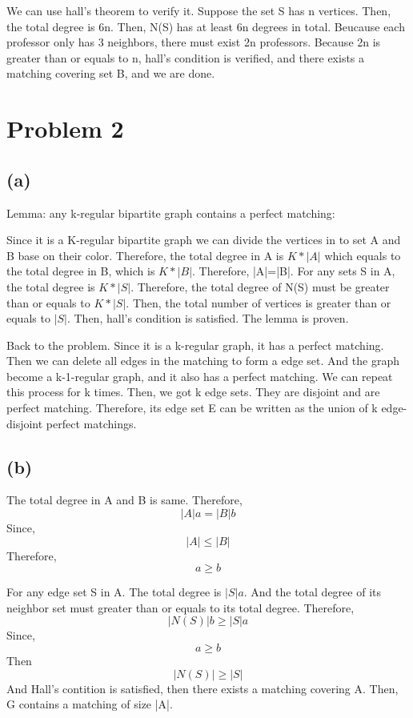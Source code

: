 \documentclass[11pt]{article}
\begin{document}
We can use hall's theorem to verify it. Suppose the set S has n vertices. Then, the total degree is 6n. Then, N(S) has at least 6n degrees in total. Beucause each professor only has 3 neighbors, there must exist 2n professors. Because 2n is greater than or equals to n, hall's condition is verified, and there exists a matching covering set B, and we are done.

\section{Problem 2}
\subsection*{(a)}
Lemma: any k-regular bipartite graph contains a perfect matching:

Since it is a K-regular bipartite graph we can divide the vertices in to set A and B base on their color. Therefore, the total degree in A is $K * |A|$ which equals to the total degree in B, which is $K * |B|$. Therefore, |A|=|B|. For any sets S in A, the total degree is $K * |S|$. Therefore, the total degree of N(S) must be greater than or equals to $K * |S|$. Then, the total number of vertices is  greater than or equals to $|S|$. Then, hall's condition is satisfied. The lemma is proven.

Back to the problem. Since it is a k-regular graph, it has a perfect matching. Then we can delete all edges in the matching to form a edge set. And the graph become a k-1-regular graph, and it also has a perfect matching. We can repeat this process for k times. Then, we got k edge sets. They are disjoint and are perfect matching. Therefore, its edge set E can be written as the union of k edge-disjoint perfect matchings.

\subsection*{(b)}

The total degree in A and B is same. Therefore, $$|A|a=|B|b$$
Since, $$|A|\le|B|$$
Therefore, $$a\ge b$$

For any edge set S in A. The total degree is $|S| a $. And the total degree of its neighbor set must greater than or equals to its total degree. Therefore, 
$$|N(S)|b \ge |S|a $$
Since,$$a\ge b$$ Then
$$|N(S)| \ge |S| $$
And Hall's contition is satisfied, then there exists a matching covering A. Then, G contains a matching of size |A|.
\end{document}
